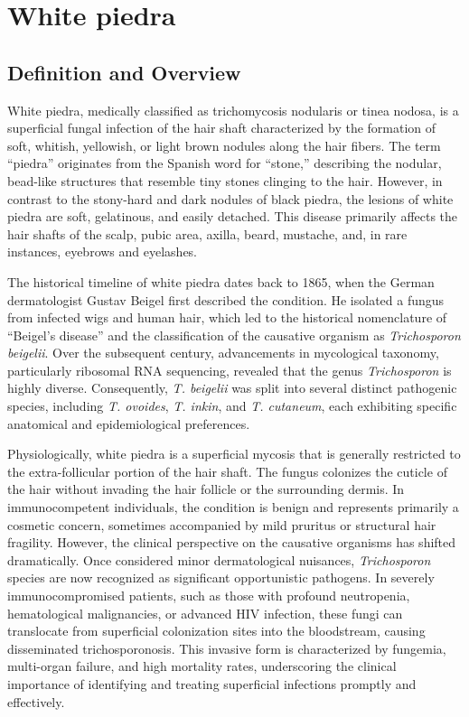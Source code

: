 \chapter{White piedra}

\section*{Definition and Overview}
White piedra, medically classified as trichomycosis nodularis or tinea nodosa, is a superficial fungal infection of the hair shaft characterized by the formation of soft, whitish, yellowish, or light brown nodules along the hair fibers. The term ``piedra'' originates from the Spanish word for ``stone,'' describing the nodular, bead-like structures that resemble tiny stones clinging to the hair. However, in contrast to the stony-hard and dark nodules of black piedra, the lesions of white piedra are soft, gelatinous, and easily detached. This disease primarily affects the hair shafts of the scalp, pubic area, axilla, beard, mustache, and, in rare instances, eyebrows and eyelashes.

The historical timeline of white piedra dates back to 1865, when the German dermatologist Gustav Beigel first described the condition. He isolated a fungus from infected wigs and human hair, which led to the historical nomenclature of ``Beigel's disease'' and the classification of the causative organism as \textit{Trichosporon beigelii}. Over the subsequent century, advancements in mycological taxonomy, particularly ribosomal RNA sequencing, revealed that the genus \textit{Trichosporon} is highly diverse. Consequently, \textit{T. beigelii} was split into several distinct pathogenic species, including \textit{T. ovoides}, \textit{T. inkin}, and \textit{T. cutaneum}, each exhibiting specific anatomical and epidemiological preferences.

Physiologically, white piedra is a superficial mycosis that is generally restricted to the extra-follicular portion of the hair shaft. The fungus colonizes the cuticle of the hair without invading the hair follicle or the surrounding dermis. In immunocompetent individuals, the condition is benign and represents primarily a cosmetic concern, sometimes accompanied by mild pruritus or structural hair fragility. However, the clinical perspective on the causative organisms has shifted dramatically. Once considered minor dermatological nuisances, \textit{Trichosporon} species are now recognized as significant opportunistic pathogens. In severely immunocompromised patients, such as those with profound neutropenia, hematological malignancies, or advanced HIV infection, these fungi can translocate from superficial colonization sites into the bloodstream, causing disseminated trichosporonosis. This invasive form is characterized by fungemia, multi-organ failure, and high mortality rates, underscoring the clinical importance of identifying and treating superficial infections promptly and effectively.

